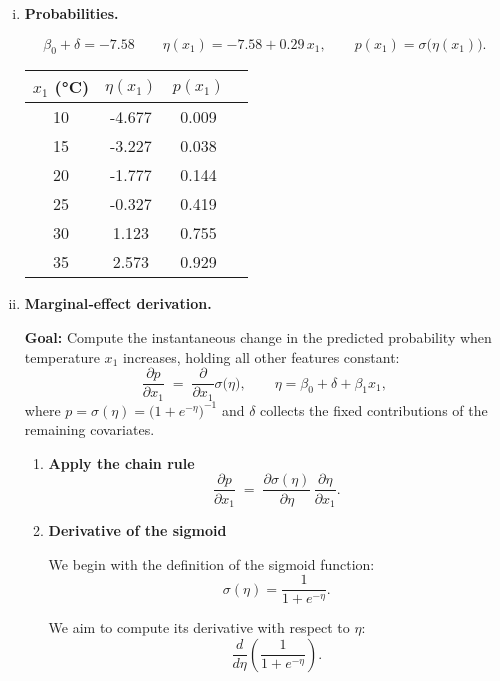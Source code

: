 {\begin{enumerate}[a)]
\begin{enumerate}[(i)]
    \item\textbf{Probabilities.}
    
    
    \[
    \beta_0+\delta=-7.58
    \qquad
    \eta(x_1)=-7.58 + 0.29\,x_1,
    \qquad
    p(x_1)=\sigma\!\bigl(\eta(x_1)\bigr).
    \]
    
    \begin{center}
    \begin{tabular}{cccc}
    \toprule
    \(x_1\) (\si{\celsius}) & \(\eta(x_1)\) & \(p(x_1)\) \\
    \midrule
    10 &  -4.677 & 0.009 \\
    15 &  -3.227 & 0.038 \\
    20 &  -1.777 & 0.144 \\
    25 &  -0.327 & 0.419 \\
    30 &   1.123 & 0.755 \\
    35 &   2.573 & 0.929 \\
    \bottomrule
    \end{tabular}
    \end{center}
    \item\textbf{Marginal‐effect derivation.}
    
    \textbf{Goal:} Compute the instantaneous change in the predicted probability  
    when temperature \(x_{1}\) increases, holding all other features constant:
    \[
    \frac{\partial p}{\partial x_{1}}
       \;=\;
       \frac{\partial}{\partial x_{1}}
       \sigma\!\bigl(\eta\bigr),
       \qquad
       \eta=\beta_{0}+\delta+\beta_{1}x_{1},
    \]
    where \(p=\sigma(\eta)=\bigl(1+e^{-\eta}\bigr)^{-1}\) and  
    \(\delta\) collects the fixed contributions of the remaining covariates.
    
    \begin{enumerate}
      \item \textbf{Apply the chain rule}
      \[
        \frac{\partial p}{\partial x_{1}}
         \;=\;
         \frac{\partial \sigma(\eta)}{\partial \eta}\,
         \frac{\partial \eta}{\partial x_{1}} .
      \]
    
      \item \textbf{Derivative of the sigmoid}
      
      We begin with the definition of the sigmoid function:
    \[
    \sigma(\eta) = \frac{1}{1 + e^{-\eta}}.
    \]
    
    We aim to compute its derivative with respect to \( \eta \):
    \[
    \frac{d}{d\eta} \left( \frac{1}{1 + e^{-\eta}} \right).
    \]
    

\end{enumerate}
\end{enumerate}
\end{enumerate}}
